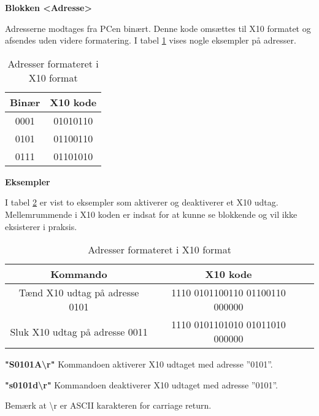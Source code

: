\textbf{Blokken <Adresse>}

Adresserne modtages fra PCen binært. Denne kode omsættes til X10 formatet og afsendes uden videre formatering.
I tabel \ref{tabel:X10Adresser} vises nogle eksempler på adresser.

\begin{table}[h]
\caption{Adresser formateret i X10 format}
\centering
\begin{tabular}{|c|c|}
\hline 
\textbf{Binær} & \textbf{X10 kode} \\ 
\hline 
0001 & 01010110 \\ 
\hline 
0101 & 01100110 \\ 
\hline
0111 & 01101010 \\
\hline
\end{tabular}
\label{tabel:X10Adresser}
\end{table} 

\textbf{Eksempler}

I tabel \ref{tabel:X10Eksempler} er vist to eksempler som aktiverer og deaktiverer et X10 udtag. Mellemrummende i X10 koden er indsat for at kunne se blokkende og vil ikke eksisterer i praksis.

\begin{table}[h]
\caption{Adresser formateret i X10 format}
\centering
\begin{tabular}{|c|c|c|}
\hline 
\textbf{Kommando} & \textbf{X10 kode} \\ 
\hline 
Tænd X10 udtag på adresse 0101 & 1110 0101100110 01100110 000000 \\ 
\hline 
Sluk X10 udtag på adresse 0011 & 1110 0101101010 01011010 000000 \\ 
\hline
\end{tabular}
\label{tabel:X10Eksempler}
\end{table} 

\textbf{"S0101A\textbackslash r"}
Kommandoen aktiverer X10 udtaget med adresse ''0101''.

\textbf{"s0101d\textbackslash r"}
Kommandoen deaktiverer X10 udtaget med adresse ''0101''.

Bemærk at \textbackslash r er ASCII karakteren for carriage return.

